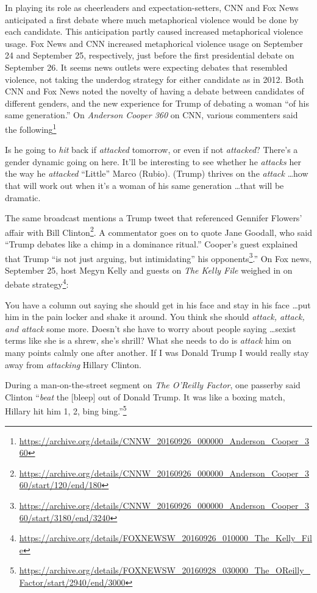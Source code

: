 In playing its role as cheerleaders and expectation-setters, 
CNN and Fox News anticipated a first debate where much metaphorical violence
would be done by each candidate. This anticipation partly caused increased 
metaphorical violence usage.
Fox News and CNN increased metaphorical violence usage on 
September 24 and September 25, respectively, just before the first 
presidential debate on September 26. 
It seems news outlets were expecting debates that resembled violence, not
taking the underdog strategy for either candidate as in 2012.
Both CNN and Fox News noted the novelty of having a debate between 
candidates of different genders, and the new experience for Trump of debating
a woman ``of his same generation.''
On \emph{Anderson Cooper 360} on CNN, various commenters said the 
following\footnote{\url{https://archive.org/details/CNNW_20160926_000000_Anderson_Cooper_360}}

\begin{exe}
  \ex Is he going to \emph{hit} back if \emph{attacked} tomorrow, or even if not \emph{attacked}?
  \ex There's a gender dynamic going on here.  It'll be interesting to see 
    whether he \emph{attacks} her the way he \emph{attacked} ``Little'' Marco 
    (Rubio).
  \ex (Trump) thrives on the \emph{attack} \ldots how that will work out when 
    it's a woman of his same generation \ldots that will be dramatic.
\end{exe}

The same broadcast mentions a Trump tweet that referenced Gennifer Flowers'
affair with Bill Clinton\footnote{\url{https://archive.org/details/CNNW_20160926_000000_Anderson_Cooper_360/start/120/end/180}}. A commentator goes on to quote
Jane Goodall, who said ``Trump debates like a chimp in a dominance ritual.''
Cooper's guest explained that Trump ``is not just arguing, but intimidating'' his 
opponents\footnote{\url{https://archive.org/details/CNNW_20160926_000000_Anderson_Cooper_360/start/3180/end/3240}}.''
On Fox news, September 25, host Megyn Kelly and guests on \emph{The Kelly File} 
weighed in on debate 
strategy\footnote{\url{https://archive.org/details/FOXNEWSW_20160926_010000_The_Kelly_File}}:
\begin{exe}
  \ex You have a column out saying she should get in his face and stay in his
    face \ldots put him in the pain locker and shake it around.
    You think she should \emph{attack, attack, and attack} some more. Doesn't she
    have to worry about people saying \ldots sexist terms like she is a shrew, 
    she's shrill?
  \ex What she needs to do is \emph{attack} him on many points calmly one after
    another.
  \ex If I was Donald Trump I would really stay away from \emph{attacking} Hillary
    Clinton.
\end{exe}
During a man-on-the-street segment on \emph{The O'Reilly Factor}, one 
passerby said Clinton ``\emph{beat} the [bleep] out of Donald Trump. It was
like a boxing match, Hillary hit him 1, 2, bing bing.''\footnote{\url{https://archive.org/details/FOXNEWSW_20160928_030000_The_OReilly_Factor/start/2940/end/3000}} 

